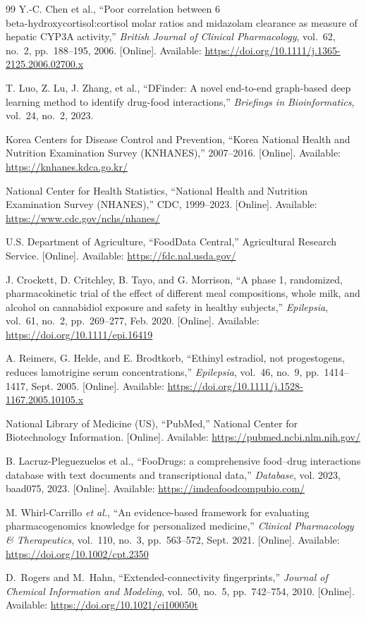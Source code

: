 \begin{thebibliography}{99}
Y.-C. Chen et al.,
``Poor correlation between 6\\beta-hydroxycortisol:cortisol molar ratios and midazolam clearance as measure of hepatic CYP3A activity,''
\textit{British Journal of Clinical Pharmacology}, vol.~62, no.~2, pp.~188--195, 2006.
[Online]. Available: \url{https://doi.org/10.1111/j.1365-2125.2006.02700.x}

T. Luo, Z. Lu, J. Zhang, et al.,
``DFinder: A novel end-to-end graph-based deep learning method to identify drug-food interactions,''
\textit{Briefings in Bioinformatics}, vol.~24, no.~2, 2023.

Korea Centers for Disease Control and Prevention,
``Korea National Health and Nutrition Examination Survey (KNHANES),''
2007--2016.
[Online]. Available: \url{https://knhanes.kdca.go.kr/}

National Center for Health Statistics,
``National Health and Nutrition Examination Survey (NHANES),''
CDC, 1999--2023.
[Online]. Available: \url{https://www.cdc.gov/nchs/nhanes/}

U.S. Department of Agriculture,
``FoodData Central,''
Agricultural Research Service.
[Online]. Available: \url{https://fdc.nal.usda.gov/}

J. Crockett, D. Critchley, B. Tayo, and G. Morrison,
``A phase 1, randomized, pharmacokinetic trial of the effect of different meal compositions, whole milk, and alcohol on cannabidiol exposure and safety in healthy subjects,''
\textit{Epilepsia}, vol.~61, no.~2, pp.~269--277, Feb. 2020.
[Online]. Available: \url{https://doi.org/10.1111/epi.16419}

A. Reimers, G. Helde, and E. Brodtkorb,
``Ethinyl estradiol, not progestogens, reduces lamotrigine serum concentrations,''
\textit{Epilepsia}, vol.~46, no.~9, pp.~1414--1417, Sept. 2005.
[Online]. Available: \url{https://doi.org/10.1111/j.1528-1167.2005.10105.x}

National Library of Medicine (US),
``PubMed,''
National Center for Biotechnology Information.
[Online]. Available: \url{https://pubmed.ncbi.nlm.nih.gov/}

B. Lacruz-Pleguezuelos et al.,
``FooDrugs: a comprehensive food--drug interactions database with text documents and transcriptional data,''
\textit{Database}, vol. 2023, baad075, 2023.
[Online]. Available: \url{https://imdeafoodcompubio.com/}

M. Whirl-Carrillo \textit{et al.},
``An evidence-based framework for evaluating pharmacogenomics knowledge for personalized medicine,''
\textit{Clinical Pharmacology & Therapeutics}, vol.~110, no.~3, pp.~563--572, Sept. 2021.
[Online]. Available: \url{https://doi.org/10.1002/cpt.2350}

D.~Rogers and M.~Hahn,
``Extended-connectivity fingerprints,''
\textit{Journal of Chemical Information and Modeling}, vol.~50, no.~5, pp.~742--754, 2010.
[Online]. Available: \url{https://doi.org/10.1021/ci100050t}

\end{thebibliography}
